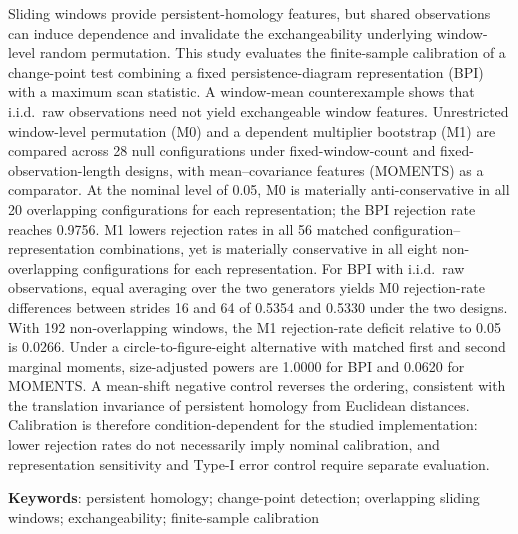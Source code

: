 Sliding windows provide persistent-homology features, but shared observations can induce dependence and invalidate the exchangeability underlying window-level random permutation. This study evaluates the finite-sample calibration of a change-point test combining a fixed persistence-diagram representation (BPI) with a maximum scan statistic. A window-mean counterexample shows that i.i.d.\ raw observations need not yield exchangeable window features. Unrestricted window-level permutation (M0) and a dependent multiplier bootstrap (M1) are compared across 28 null configurations under fixed-window-count and fixed-observation-length designs, with mean--covariance features (MOMENTS) as a comparator. At the nominal level of 0.05, M0 is materially anti-conservative in all 20 overlapping configurations for each representation; the BPI rejection rate reaches 0.9756. M1 lowers rejection rates in all 56 matched configuration--representation combinations, yet is materially conservative in all eight non-overlapping configurations for each representation. For BPI with i.i.d.\ raw observations, equal averaging over the two generators yields M0 rejection-rate differences between strides 16 and 64 of 0.5354 and 0.5330 under the two designs. With 192 non-overlapping windows, the M1 rejection-rate deficit relative to 0.05 is 0.0266. Under a circle-to-figure-eight alternative with matched first and second marginal moments, size-adjusted powers are 1.0000 for BPI and 0.0620 for MOMENTS. A mean-shift negative control reverses the ordering, consistent with the translation invariance of persistent homology from Euclidean distances. Calibration is therefore condition-dependent for the studied implementation: lower rejection rates do not necessarily imply nominal calibration, and representation sensitivity and Type-I error control require separate evaluation.

\noindent\textbf{Keywords}: persistent homology; change-point detection; overlapping sliding windows; exchangeability; finite-sample calibration
